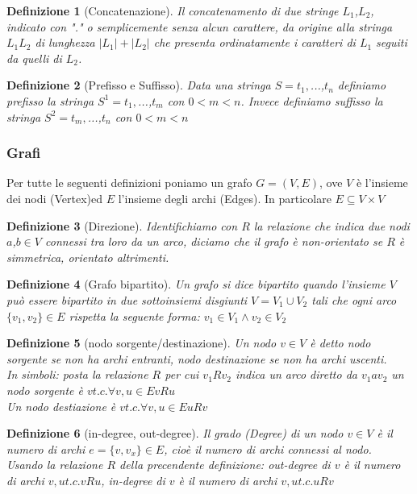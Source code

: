 \documentclass[a4paper]{article}
\newtheorem*{definition}{Definizione}
\begin{document}
\begin{definition}[Concatenazione] Il concatenamento di due stringe $L_1$,$L_2$, indicato con "." o semplicemente senza alcun carattere, da origine alla stringa $L_1L_2$ di lunghezza $|L_1| + |L_2|$ che presenta ordinatamente i caratteri di $L_1$ seguiti da quelli di $L_2$.
\end{definition}

\begin{definition}[Prefisso e Suffisso]Data una stringa $S = t_1,$...,$t_n$ definiamo prefisso la stringa $S^1 = t_1,$...,$t_m$ con $ 0 < m < n$. Invece definiamo suffisso la stringa $S^2 = t_m,$...,$t_n$ con $ 0 < m < n$ 
\end{definition}


\subsubsection{Grafi}

Per tutte le seguenti definizioni poniamo un grafo $G =(V, E)$, ove $V$ è l'insieme dei nodi (Vertex)ed $E$ l'insieme degli archi (Edges). In particolare $E \subseteq V\times V$  
\begin{definition}[Direzione]Identifichiamo con $R$ la relazione che indica due nodi $a$,$b$$\in V$ connessi tra loro da un arco, diciamo che il grafo è non-orientato se $R$ è simmetrica, orientato altrimenti.
\end{definition}

\begin{definition}[Grafo bipartito]Un grafo si dice bipartito quando l'insieme $V$ può essere bipartito in due sottoinsiemi disgiunti $V=V_1\cup V_2$ tali che ogni arco $\{v_1,v_2\} \in E$ rispetta la seguente forma: $v_1 \in V_1 \land v_2 \in V_2$
\end{definition}

\begin{definition}[nodo sorgente/destinazione]Un nodo $v \in V$ è detto nodo sorgente se non ha archi entranti, nodo destinazione se non ha archi uscenti.\\
In simboli: posta la relazione $R$ per cui $v_1Rv_2$ indica un arco diretto da $v_1 a v_2$ un nodo sorgente è $v t.c. \forall {v,u} \in E vRu$\\
Un nodo destiazione è $v t.c. \forall {v,u} \in E uRv$
\end{definition}

\begin{definition}[in-degree, out-degree]Il grado (Degree) di un nodo $v \in V$ è il numero di archi $e = \{v,v_x\}\in E$, cioè il numero di archi connessi al nodo.\\
Usando la relazione $R$ della precendente definizione: out-degree di $v$ è il numero di archi ${v,u} t.c. vRu$, in-degree di $v$ è il numero di archi ${v,u} t.c. uRv$
\end{definition}
\end{document}
